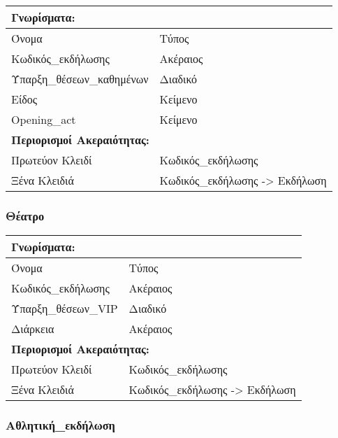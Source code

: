 \begin{tabular}{|p{6cm}|p{8cm}|}
  \multicolumn{2}{l}{\textbf{Γνωρίσματα:}}                   \\ \hline
  Όνομα                     & Τύπος                          \\ \hline
  Κωδικός\_εκδήλωσης        & Ακέραιος                       \\ \hline
  Ύπαρξη\_θέσεων\_καθημένων & Διαδικό                        \\ \hline
  Είδος                     & Κείμενο                        \\ \hline
  Opening\_act              & Κείμενο                        \\ \hline
  \multicolumn{2}{l}{\textbf{Περιορισμοί Ακεραιότητας:}}     \\ \hline
  Πρωτεύον Κλειδί           & Κωδικός\_εκδήλωσης             \\ \hline
  Ξένα Κλειδιά              & Κωδικός\_εκδήλωσης -> Εκδήλωση \\ \hline
\end{tabular}

\subsubsection{Θέατρο}

\begin{tabular}{|p{6cm}|p{8cm}|}
  \multicolumn{2}{l}{\textbf{Γνωρίσματα:}}               \\ \hline
  Όνομα               & Τύπος                            \\ \hline
  Κωδικός\_εκδήλωσης  & Ακέραιος                         \\ \hline
  Ύπαρξη\_θέσεων\_VIP & Διαδικό                          \\ \hline
  Διάρκεια            & Ακέραιος                         \\ \hline
  \multicolumn{2}{l}{\textbf{Περιορισμοί Ακεραιότητας:}} \\ \hline
  Πρωτεύον Κλειδί     & Κωδικός\_εκδήλωσης               \\ \hline
  Ξένα Κλειδιά        & Κωδικός\_εκδήλωσης -> Εκδήλωση   \\ \hline
\end{tabular}

\subsubsection{Αθλητική\_εκδήλωση}

